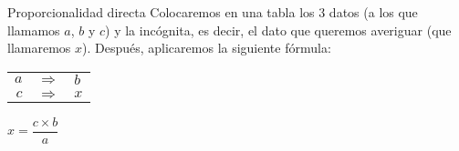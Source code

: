 \begin{infocard}{Proporcionalidad directa}
    Colocaremos en una tabla los 3 datos (a los que llamamos $a$, $b$ y $c$) y
    la incógnita, es decir, el dato que queremos averiguar (que llamaremos
    $x$).
    Después, aplicaremos la siguiente fórmula:
    \begin{center}
        \begin{tabular}{r>{\centering}p{0.2cm}l}
            $a$ & $\Rightarrow$ & $b$ \\
            $c$ & $\Rightarrow$ & $x$
        \end{tabular}\quad$x=\dfrac{c \times b}{a}$
    \end{center}
\end{infocard}